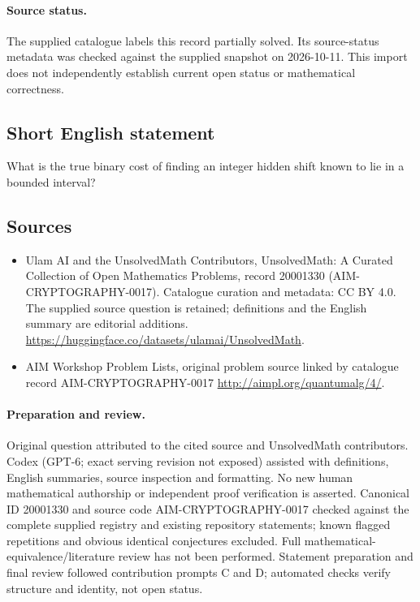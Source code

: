 \documentclass[11pt]{article}
\begin{document}
\paragraph{Source status.}
The supplied catalogue labels this record partially solved. Its source-status metadata was checked against the supplied snapshot on 2026-10-11. This import does not independently establish current open status or mathematical correctness.
\subsection{Short English statement}
What is the true binary cost of finding an integer hidden shift known to lie in a bounded interval?
\subsection{Sources}
\begin{itemize}
\item[S1] Ulam AI and the UnsolvedMath Contributors, UnsolvedMath: A Curated Collection of Open Mathematics Problems, record 20001330 (AIM-CRYPTOGRAPHY-0017). Catalogue curation and metadata: CC BY 4.0. The supplied source question is retained; definitions and the English summary are editorial additions.
\url{https://huggingface.co/datasets/ulamai/UnsolvedMath}.
\item[S2] AIM Workshop Problem Lists, original problem source linked by catalogue record AIM-CRYPTOGRAPHY-0017
\url{http://aimpl.org/quantumalg/4/}.
\end{itemize}
\paragraph{Preparation and review.}
Original question attributed to the cited source and UnsolvedMath contributors. Codex (GPT-6; exact serving revision not exposed) assisted with definitions, English summaries, source inspection and formatting. No new human mathematical authorship or independent proof verification is asserted. Canonical ID 20001330 and source code AIM-CRYPTOGRAPHY-0017 checked against the complete supplied registry and existing repository statements; known flagged repetitions and obvious identical conjectures excluded. Full mathematical-equivalence/literature review has not been performed. Statement preparation and final review followed contribution prompts C and D; automated checks verify structure and identity, not open status.
\label{end:20001330}
\end{document}
